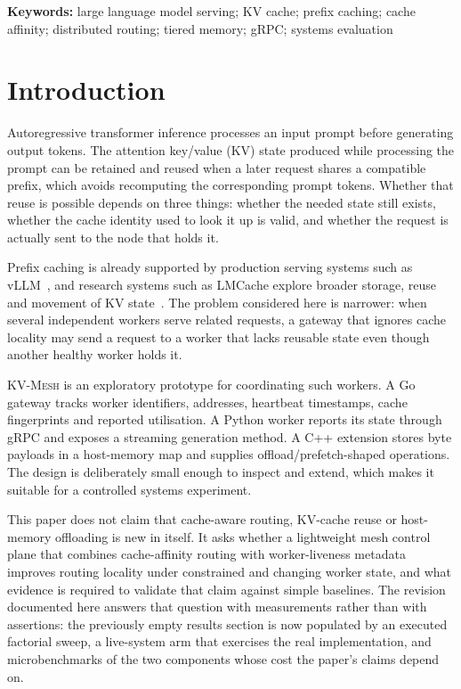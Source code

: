 \documentclass[10pt,twocolumn]{article}
\newcommand{\kvmesh}{\textsc{KV-Mesh}}
\begin{document}
\noindent\textbf{Keywords:} large language model serving; KV cache; prefix
caching; cache affinity; distributed routing; tiered memory; gRPC; systems
evaluation

\section{Introduction}

Autoregressive transformer inference processes an input prompt before
generating output tokens. The attention key/value (KV) state produced while
processing the prompt can be retained and reused when a later request shares a
compatible prefix, which avoids recomputing the corresponding prompt tokens.
Whether that reuse is possible depends on three things: whether the needed
state still exists, whether the cache identity used to look it up is valid,
and whether the request is actually sent to the node that holds it.

Prefix caching is already supported by production serving systems such as
vLLM~\cite{vllm_prefix_caching}, and research systems such as LMCache
explore broader storage, reuse and movement of KV state~\cite{lmcache}.
The problem considered here is narrower: when several independent workers serve
related requests, a gateway that ignores cache locality may send a request to a
worker that lacks reusable state even though another healthy worker holds it.

\kvmesh{} is an exploratory prototype for coordinating such workers. A Go
gateway tracks worker identifiers, addresses, heartbeat timestamps, cache
fingerprints and reported utilisation. A Python worker reports its state
through gRPC and exposes a streaming generation method. A C++ extension stores
byte payloads in a host-memory map and supplies offload/prefetch-shaped
operations. The design is deliberately small enough to inspect and extend,
which makes it suitable for a controlled systems experiment.

This paper does not claim that cache-aware routing, KV-cache reuse or
host-memory offloading is new in itself. It asks whether a lightweight mesh
control plane that combines cache-affinity routing with worker-liveness
metadata improves routing locality under constrained and changing worker
state, and what evidence is required to validate that claim against simple
baselines. The revision documented here answers that question with measurements
rather than with assertions: the previously empty results section is now
populated by an executed factorial sweep, a live-system arm that exercises the
real implementation, and microbenchmarks of the two components whose cost the
paper's claims depend on.
\end{document}
